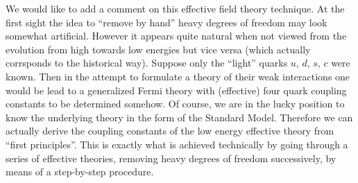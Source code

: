 We would like to add a comment on this effective field theory
technique. At the first sight the idea to ``remove by hand''
heavy degrees of freedom may look somewhat artificial. However it
appears quite natural when not viewed from the evolution from high
towards low energies but vice versa (which actually corrsponds to
the historical way). Suppose only the ``light'' quarks $u$, $d$, $s$,
$c$ were known. Then in the attempt to formulate a theory of their
weak interactions one would be lead to a generalized Fermi theory
with (effective) four quark coupling constants to be determined
somehow. Of course, we are in the lucky position to know the
underlying theory in the form of the Standard Model. Therefore we
can actually derive the coupling constants of the low energy effective
theory from ``first principles''. This is exactly what is achieved
technically by going through a series of effective theories, removing
heavy degrees of freedom successively, by means of a step-by-step
procedure.

